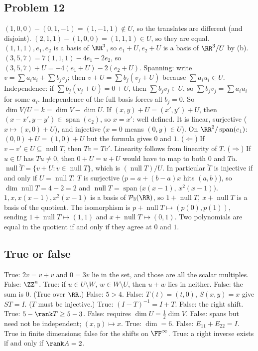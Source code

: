 \documentclass[11pt]{scrartcl}
\DeclareMathOperator{\nul}{null}
\DeclareMathOperator{\spn}{span}
\newcommand{\PP}{\mathcal P}
\begin{document}
\subsection*{Problem 12}
\begin{enumerate}[(a)]
  \ii $(1,0,0)-(0,1,-1)=(1,-1,1)\notin U$, so the translates are different (and disjoint).
  $(2,1,1)-(1,0,0)=(1,1,1)\in U$, so they are equal.
  $(1,1,1),e_1,e_2$ is a basis of $\RR^3$, so $e_1+U,e_2+U$ is a basis of $\RR^3/U$ by (b).
  $(3,5,7)=7(1,1,1)-4e_1-2e_2$, so $(3,5,7)+U=-4(e_1+U)-2(e_2+U)$.
  \ii Spanning: write $v=\sum a_iu_i+\sum b_jv_j$; then $v+U=\sum b_j(v_j+U)$ because $\sum a_iu_i\in U$.
  Independence: if $\sum b_j(v_j+U)=0+U$, then $\sum b_jv_j\in U$, so $\sum b_jv_j=\sum a_iu_i$ for some $a_i$.
  Independence of the full basis forces all $b_j=0$.
  So $\dim V/U=k=\dim V-\dim U$.
  \ii If $(x,y)+U=(x',y')+U$, then $(x-x',y-y')\in\spn(e_2)$, so $x=x'$: well defined.
  It is linear, surjective ($x\mapsto(x,0)+U$), and injective ($x=0$ means $(0,y)\in U$).
  On $\RR^2/\spn(e_1)$: $(0,0)+U=(1,0)+U$ but the formula gives $0$ and $1$.
  \ii ($\Leftarrow$) If $v-v'\in U\subseteq\nul T$, then $Tv=Tv'$.
  Linearity follows from linearity of $T$.
  ($\Rightarrow$) If $u\in U$ has $Tu\ne0$, then $0+U=u+U$ would have to map to both $0$ and $Tu$.
  $\nul\tilde T=\{v+U:v\in\nul T\}$, which is $(\nul T)/U$.
  In particular $\tilde T$ is injective if and only if $U=\nul T$.
  \ii $T$ is surjective ($p=a+(b-a)x$ hits $(a,b)$), so $\dim\nul T=4-2=2$ and $\nul T=\spn\big(x(x-1),\,x^2(x-1)\big)$.
  $1,x,x(x-1),x^2(x-1)$ is a basis of $\PP_3(\RR)$, so $1+\nul T,\ x+\nul T$ is a basis of the quotient.
  The isomorphism is $p+\nul T\mapsto(p(0),p(1))$, sending $1+\nul T\mapsto(1,1)$ and $x+\nul T\mapsto(0,1)$.
  Two polynomials are equal in the quotient if and only if they agree at $0$ and $1$.
\end{enumerate}

\subsection*{True or false}
\begin{enumerate}
  \ii True: $2v=v+v$ and $0=3v$ lie in the set, and those are all the scalar multiples.
  \ii False: $\ZZ^n$.
  \ii True: if $u\in U\setminus W$, $w\in W\setminus U$, then $u+w$ lies in neither.
  \ii False: the sum is $0$. (True over $\RR$.)
  \ii False: $5>4$.
  \ii False: $T(t)=(t,0)$, $S(x,y)=x$ give $ST=I$. ($T$ must be injective.)
  \ii True: $(I-T)^{-1}=I+T$.
  \ii False: the right shift.
  \ii True: $5-\rank T\ge5-3$.
  \ii False: requires $\dim U=\frac12\dim V$.
  \ii False: spans but need not be independent; $(x,y)\mapsto x$.
  \ii True: $\dim=6$.
  \ii False: $E_{11}+E_{22}=I$.
  \ii True in finite dimensions; false for the shifts on $\FF^\infty$.
  \ii True: a right inverse exists if and only if $\rank A=2$.
\end{enumerate}
\end{document}
